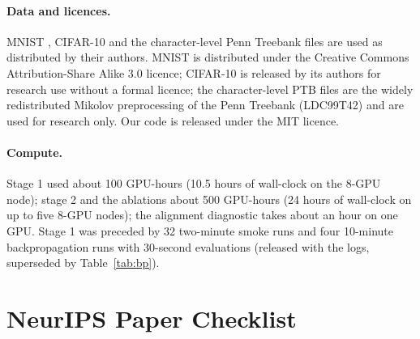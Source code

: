 \documentclass{article}
\begin{document}
\paragraph{Data and licences.}
MNIST \citep{lecun1998}, CIFAR-10 \citep{krizhevsky2009} and the character-level Penn
Treebank files \citep{marcus1993,mikolov2012} are used as distributed by their
authors. MNIST is distributed under the Creative Commons Attribution-Share Alike 3.0
licence; CIFAR-10 is released by its authors for research use without a formal
licence; the character-level PTB files are the widely redistributed Mikolov
preprocessing of the Penn Treebank (LDC99T42) and are used for research only. Our code
is released under the MIT licence.

\paragraph{Compute.}
Stage 1 used about 100 GPU-hours (10.5 hours of wall-clock on the 8-GPU node);
stage 2 and the ablations about 500 GPU-hours (24 hours of wall-clock on up to five
8-GPU nodes); the alignment diagnostic takes about an hour on one GPU. Stage 1 was preceded by 32 two-minute smoke runs and
four 10-minute backpropagation runs with 30-second evaluations (released with the
logs, superseded by Table~\ref{tab:bp}).

\clearpage
\section*{NeurIPS Paper Checklist}
\end{document}
